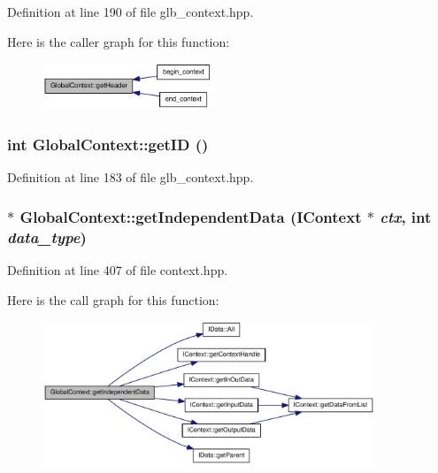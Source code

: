 Definition at line 190 of file glb\_\-context.hpp.

Here is the caller graph for this function:\nopagebreak
\begin{figure}[H]
\begin{center}
\leavevmode
\includegraphics[width=144pt]{class_global_context_acede5d21ec0546c5a97ee5752960183a_icgraph}
\end{center}
\end{figure}
\hypertarget{class_global_context_aed100f956efac564393ecdc088f1ef54}{
\subsubsection[{getID}]{\setlength{\rightskip}{0pt plus 5cm}int GlobalContext::getID ()}}
\label{class_global_context_aed100f956efac564393ecdc088f1ef54}


Definition at line 183 of file glb\_\-context.hpp.\hypertarget{class_global_context_a9cf2bd9142e7592455d0542ee457f6ff}{
\subsubsection[{getIndependentData}]{ $\ast$ GlobalContext::getIndependentData ({\bf IContext} $\ast$ {\em ctx}, \/  int {\em data\_\-type})}}
\label{class_global_context_a9cf2bd9142e7592455d0542ee457f6ff}


Definition at line 407 of file context.hpp.

Here is the call graph for this function:\nopagebreak
\begin{figure}[H]
\begin{center}
\leavevmode
\includegraphics[width=282pt]{class_global_context_a9cf2bd9142e7592455d0542ee457f6ff_cgraph}
\end{center}
\end{figure}


